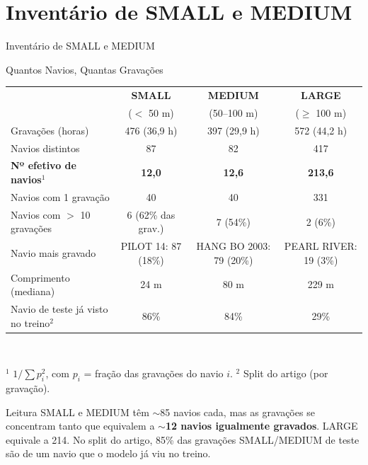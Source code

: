 \documentclass[aspectratio=169]{beamer}
\newcommand{\cahi}[1]{\cellcolor{green!30}\textbf{#1}}
\newcommand{\calo}[1]{\cellcolor{red!20}#1}
\begin{document}
\section{Inventário de SMALL e MEDIUM}

\begin{frame}
    \centering
    \huge Inventário de SMALL e MEDIUM
\end{frame}

\begin{frame}{Quantos Navios, Quantas Gravações}
    \footnotesize
    \begin{table}
    \centering
    \scriptsize
    \setlength{\tabcolsep}{3pt}
    \begin{tabular}{lccc}
    \toprule
     & \textbf{SMALL} & \textbf{MEDIUM} & \textbf{LARGE} \\
     & ($<$ 50 m) & (50--100 m) & ($\geq$ 100 m) \\
    \midrule
    Gravações (horas) & 476 (36,9 h) & 397 (29,9 h) & 572 (44,2 h) \\
    Navios distintos & 87 & 82 & 417 \\
    \textbf{Nº efetivo de navios}$^1$ & \calo{\textbf{12,0}} & \calo{\textbf{12,6}} & \cahi{213,6} \\
    Navios com 1 gravação & 40 & 40 & 331 \\
    Navios com $>$ 10 gravações & 6 (62\% das grav.) & 7 (54\%) & 2 (6\%) \\
    Navio mais gravado & PILOT 14: 87 (18\%) & HANG BO 2003: 79 (20\%) & PEARL RIVER: 19 (3\%) \\
    Comprimento (mediana) & 24 m & 80 m & 229 m \\
    \midrule
    Navio de teste já visto no treino$^2$ & \calo{86\%} & \calo{84\%} & 29\% \\
    \bottomrule
    \end{tabular}\\[2pt]
    {\tiny $^1$ $1/\sum p_i^2$, com $p_i$ = fração das gravações do navio $i$. \quad $^2$ Split do artigo (por gravação).\par}
    \end{table}
    \vspace{0.05cm}
    \begin{alertblock}{Leitura}
        \scriptsize
        SMALL e MEDIUM têm $\sim$85 navios cada, mas as gravações se concentram tanto que equivalem a \textbf{$\sim$12 navios igualmente gravados}. LARGE equivale a 214. No split do artigo, 85\% das gravações SMALL/MEDIUM de teste são de um navio que o modelo já viu no treino.
    \end{alertblock}
\end{frame}
\end{document}
